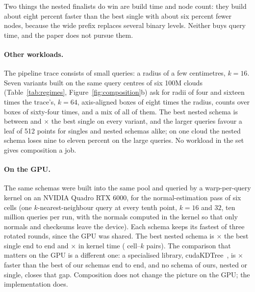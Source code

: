 Two things the nested finalists do win are build time and node count: they build about eight percent faster than the best single with about six percent fewer nodes, because the wide prefix replaces several binary levels. Neither buys query time, and the paper does not pursue them.

\paragraph{Other workloads.} The pipeline trace consists of small queries: a radius of a few centimetres, $k = 16$. Seven variants built on the same query centres of six 100M clouds (Table~\ref{tab:regimes}, Figure~\ref{fig:composition}b) ask for radii of four and sixteen times the trace's, $k = 64$, axis-aligned boxes of eight times the radius, counts over boxes of sixty-four times, and a mix of all of them. The best nested schema is between \workloadNestedSingleMin{} and \workloadNestedSingleMax$\times$ the best single on every variant, and the larger queries favour a leaf of 512 points for singles and nested schemas alike; on one cloud the nested schema loses nine to eleven percent on the large queries. No workload in the set gives composition a job.

\paragraph{On the GPU.} The same schemas were built into the same pool and queried by a warp-per-query kernel on an NVIDIA Quadro RTX 6000, for the normal-estimation pass of six cells (one $k$-nearest-neighbour query at every tenth point, $k = 16$ and $32$, ten million queries per run, with the normals computed in the kernel so that only normals and checksums leave the device). Each schema keeps its fastest of three rotated rounds, since the GPU was shared. The best nested schema is \gpuNestedSingleTotal$\times$ the best single end to end and \gpuNestedSingleKernel$\times$ in kernel time (\nGpuRows{} cell--$k$ pairs). The comparison that matters on the GPU is a different one: a specialised library, cudaKDTree~\cite{wald2022cudakdtree}, is \oursOverCudaKdTree$\times$ faster than the best of our schemas end to end, and no schema of ours, nested or single, closes that gap. Composition does not change the picture on the GPU; the implementation does.

